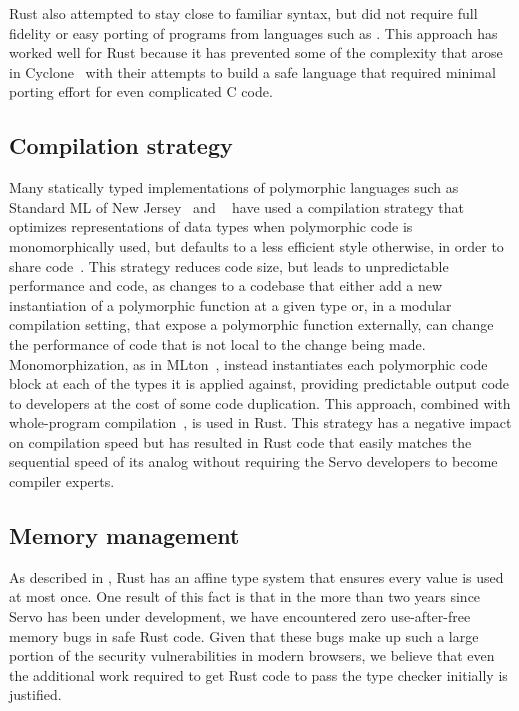 Rust also attempted to stay close to familiar syntax, but did not require full fidelity or easy porting of
programs from languages such as \Cplusplus{}.
This approach has worked well for Rust because it has prevented some of the complexity that arose in
Cyclone~\cite{cyclone} with their attempts to build a safe language that required minimal porting effort
for even complicated C code.

\subsection{Compilation strategy}
Many statically typed implementations of polymorphic languages such as Standard ML of New Jersey~\cite{SMLNJ} and
\ocaml{}~\cite{ocaml-manual-3.0} have used a compilation strategy that optimizes representations of data types when
polymorphic code is monomorphically used, but defaults to a less efficient style otherwise, in order to share
code~\cite{ocaml-repr}.
This strategy reduces code size, but leads to unpredictable performance and code, as changes to a codebase that
either add a new instantiation of a polymorphic function at a given type or, in a modular compilation setting, that
expose a polymorphic function externally, can change the performance of code that is not local to the change being
made.
Monomorphization, as in MLton~\cite{mlton-compiler}, instead instantiates each polymorphic code block at each of the types
it is applied against, providing predictable output code to developers at the cost of some code duplication.
This approach, combined with whole-program compilation~\cite{weeks:whole-program-mlton}, is used in Rust.
This strategy has a negative impact on compilation speed but has resulted in Rust code that easily matches the
sequential speed of its \Cplusplus{} analog without requiring the Servo developers to become compiler experts.

\subsection{Memory management}
As described in , Rust has an affine type system that ensures every value is used at
most once.
One result of this fact is that in the more than two years since Servo has been under development, we have
encountered zero use-after-free memory bugs in safe Rust code.
Given that these bugs make up such a large portion of the security vulnerabilities in modern browsers,
we believe that even the additional work required to get Rust code to pass the type checker initially is
justified.

